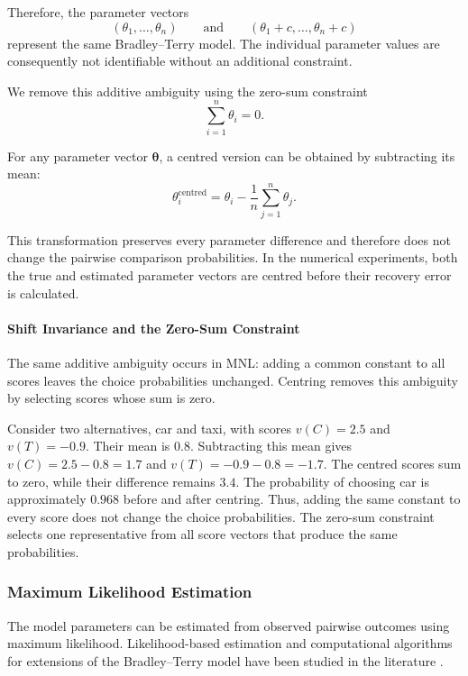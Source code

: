 \documentclass[11pt,a4paper]{article}
\begin{document}
Therefore, the parameter vectors
\[
(\theta_1,\ldots,\theta_n)
\qquad\text{and}\qquad
(\theta_1+c,\ldots,\theta_n+c)
\]
represent the same Bradley--Terry model. The individual parameter
values are consequently not identifiable without an additional
constraint.

We remove this additive ambiguity using the zero-sum constraint
\begin{equation}
    \sum_{i=1}^{n}\theta_i=0.
    \label{eq:btl-zero-sum}
\end{equation}

For any parameter vector \(\boldsymbol{\theta}\), a centred version can
be obtained by subtracting its mean:
\begin{equation}
    \theta_i^{\mathrm{centred}}
    =
    \theta_i
    -
    \frac{1}{n}
    \sum_{j=1}^{n}\theta_j.
    \label{eq:btl-centring}
\end{equation}

This transformation preserves every parameter difference and therefore
does not change the pairwise comparison probabilities. In the numerical
experiments, both the true and estimated parameter vectors are centred
before their recovery error is calculated.


\paragraph{Shift Invariance and the Zero-Sum Constraint}
The same additive ambiguity occurs in MNL: adding a common constant to all scores leaves the choice probabilities unchanged. Centring removes this ambiguity by selecting scores whose sum is zero.

Consider two alternatives, car and taxi, with scores \(v(C)=2.5\) and \(v(T)=-0.9\). Their mean is \(0.8\). Subtracting this mean gives
$v(C)=2.5-0.8=1.7$ and $v(T)=-0.9-0.8=-1.7$.
The centred scores sum to zero, while their difference remains $3.4$. The probability of choosing car is approximately $0.968$ before and after centring.
Thus, adding the same constant to every score does not change the choice probabilities. The zero-sum constraint selects one representative from all score vectors that produce the same probabilities.

\subsubsection[Maximum likelihood estimation]{Maximum Likelihood Estimation}
The model parameters can be estimated from observed pairwise
outcomes using maximum likelihood. Likelihood-based estimation
and computational algorithms for extensions of the
Bradley--Terry model have been studied in the literature
\citep{hunter2004}.
\end{document}
